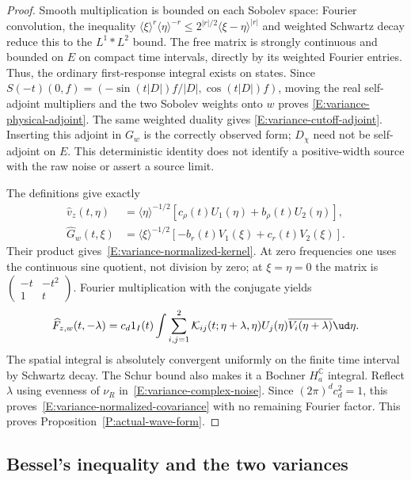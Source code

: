 \begin{proof}
  Smooth multiplication is bounded on each Sobolev space: Fourier
  convolution, the inequality
  $\langle\xi\rangle^r\langle\eta\rangle^{-r}
  \le 2^{|r|/2}\langle\xi-\eta\rangle^{|r|}$ and weighted Schwartz decay
  reduce this to the $L^1*L^2$ bound. The free matrix is strongly continuous
  and bounded on $E$ on compact time intervals, directly by its weighted
  Fourier entries. Thus, the ordinary first-response integral exists on
  states. Since
  $S(-t)(0,f)=(-\sin(t|D|)f/|D|,\cos(t|D|)f)$, moving the real
  self-adjoint multipliers and the two Sobolev weights onto $w$ proves
  \eqref{E:variance-physical-adjoint}. The same weighted duality gives
  \eqref{E:variance-cutoff-adjoint}. Inserting this adjoint in $G_w$ is
  the correctly observed form; $D_\chi$ need not be self-adjoint on $E$.
  This deterministic identity does not identify a positive-width source
  with the raw noise or assert a source limit.

  The definitions give exactly
  \begin{align*}
    \widehat v_z(t,\eta)
    &= \langle\eta\rangle^{-1/2}
    [c_\rho(t)U_1(\eta)+b_\rho(t)U_2(\eta)],\\
    \widehat G_w(t,\xi)
    &= \langle\xi\rangle^{-1/2}
    [-b_r(t)V_1(\xi)+c_r(t)V_2(\xi)].
  \end{align*}
  Their product gives~\eqref{E:variance-normalized-kernel}. At zero
  frequencies one uses the continuous sine quotient, not division by zero;
  at $\xi=\eta=0$ the matrix is
  $\left(\begin{smallmatrix}-t&-t^2\\1&t\end{smallmatrix}\right)$.
  Fourier multiplication with the conjugate yields
  \[
    \widehat F_{z,w}(t,-\lambda)
    = c_d1_I(t)\int\sum_{i,j=1}^2\mathcal K_{ij}(t;\eta+\lambda,\eta)
    U_j(\eta)\overline{V_i(\eta+\lambda)}\ud\eta.
  \]
  The spatial integral is absolutely convergent uniformly on the finite
  time interval by Schwartz decay. The Schur bound also makes it a
  Bochner $H_a^{\mathbb C}$ integral. Reflect $\lambda$ using evenness of
  $\nu_R$ in~\eqref{E:variance-complex-noise}. Since $(2\pi)^dc_d^2=1$,
  this proves~\eqref{E:variance-normalized-covariance} with no remaining
  Fourier factor.
  This proves Proposition~\ref{P:actual-wave-form}.
\end{proof}

\subsection{Bessel's inequality and the two variances}

